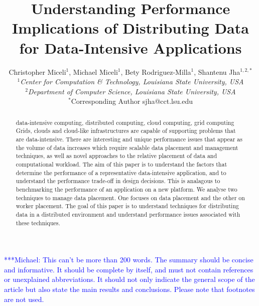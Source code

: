 \documentclass{rspublic}
\title[Understanding Performance Implications of Distributing Data for
Data-Intensive Applications]{Understanding Performance Implications of
Distributing Data for Data-Intensive Applications}
\author[Miceli, Miceli, Rodriguez-Milla, Jha]{ Christopher Miceli$^{1}$,
Michael Miceli$^{1}$, Bety Rodriguez-Milla$^{1}$, Shantenu Jha$^{1,2,*}$ \\
\small{\emph{$^{1}$Center for Computation \& Technology, Louisiana State
University, USA}} \\  \small{\emph{$^{2}$Department of Computer Science,
Louisiana State University, USA}} \\ {\footnotesize {\hspace{0.0 in}
$^*$Corresponding Author sjha@cct.lsu.edu}} }
\newcommand{\micnote}[1]{ {\textcolor{blue} { ***Michael: #1 }}}
\begin{document}
 \maketitle

\micnote{This can't be more than 200 words. The summary should be
concise and informative. It should be complete by itself, and must not
contain references or unexplained abbreviations. It should not only
indicate the general scope of the article but also state the main
results and conclusions. Please note that footnotes are not used.}

\begin{abstract}{data-intensive computing, distributed computing,
    cloud computing, grid computing} 
  Grids, clouds and cloud-like infrastructures are capable of
  supporting problems that are data-intensive. There are interesting
  and unique performance issues that appear as the volume of data
  increases which require scalable data placement and management
  techniques, as well as novel approaches to the relative placement of
  data and computational workload.  The aim of this paper is to
  understand the factors that determine the performance of a
  representative data-intensive application, and to understand the
  performance trade-off in design decisions. This is analagous to
  benchmarking the performance of an application on a new platform. We
  analyse two techniques to manage data placement. One focuses on data
  placement and the other on worker placement. The goal of this paper
  is to understand techniques for distributing data in a distributed
  environment and understand performance issues associated with these
  techniques.
\end{abstract}

\end{document}
